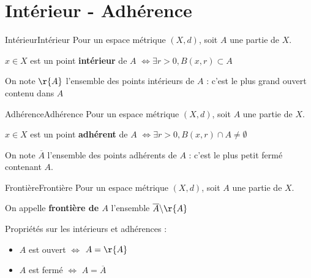 \section{Intérieur - Adhérence}
\begin{definition}{Intérieur}{Intérieur}
    Pour un espace métrique $(X,d)$, soit $A$ une partie de $X$. \newline

    \noindent $x \in X$ est un point \textbf{intérieur} de $A$ $\Longleftrightarrow \exists r > 0, B(x,r) \subset A$ \newline

    On note $\r{A}$ l'ensemble des points intérieurs de $A$ : c'est le plus grand ouvert contenu dans $A$
\end{definition}
\begin{definition}{Adhérence}{Adhérence}
    Pour un espace métrique $(X,d)$, soit $A$ une partie de $X$. \newline

    \noindent $x \in X$ est un point \textbf{adhérent} de $A$ $\Longleftrightarrow \exists r > 0, B(x,r) \cap A \neq \emptyset$ \newline

    On note $\overline{A}$ l'ensemble des points adhérents de $A$ : c'est le plus petit fermé contenant $A$.
\end{definition}
\begin{definition}{Frontière}{Frontière}
    Pour un espace métrique $(X,d)$, soit $A$ une partie de $X$. \newline

    \noindent On appelle \textbf{frontière de $A$} l'ensemble $\overline{A}  \backslash \r{A}$
\end{definition}
Propriétés sur les intérieurs et adhérences : \newline
\begin{itemize}
    \item $A$ est ouvert $\Longleftrightarrow$ $A = \r{A}$ \newline
    \item $A$ est fermé $\Longleftrightarrow$ $A = \overline{A}$
\end{itemize}
